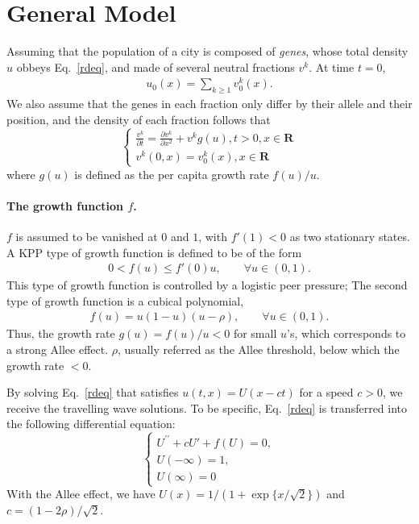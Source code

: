 \section{General Model}

Assuming that the population of a city is composed of \textit{genes}, whose total density $u$ obbeys Eq.~\ref{rdeq}, and made of several neutral fractions $v^k$. At time $t=0$, \begin{align}
    u_0(x) = \sum_{k\geq 1} v_0^k(x).
\end{align}
We also assume that the genes in each fraction only differ by their allele and their position, and the density of each fraction follows that\begin{equation}
    \left\{\begin{array}{l}
    \frac{v^{k}}{\partial{t}}=\frac{\partial v^{k}}{\partial x^2}+v^{k} g(u), t>0, x \in \mathbf{R} \\
    v^{k}(0, x)=v_{0}^{k}(x), x \in \mathbf{R}
    \end{array}\right.
\end{equation} where $g(u)$ is defined as the per capita growth rate $f(u)/u$. 

\paragraph{The growth function $f$.} 
$f$ is assumed to be vanished at $0$ and $1$, with $f'(1)<0$ as two stationary states. A KPP type of growth function is defined to be of the form~\begin{align}
    0<f(u)\le f'(0) u, \qquad \forall u \in (0,1).
\end{align} This type of growth function is controlled by a logistic peer pressure; The second type of growth function is a cubical polynomial,\begin{align}
    f(u) = u(1-u)(u-\rho), \qquad \forall u \in (0,1).
\end{align} Thus, the growth rate $g(u) = f(u)/u < 0$ for small $u$'s, which corresponds to a strong Allee effect. $\rho$, usually referred as the Allee threshold, below which the growth rate $<0$.

By solving Eq.~\ref{rdeq} that satisfies $u(t,x) = U(x-ct)$ for a speed $c>0$, we receive the travelling wave solutions. To be specific, Eq.~\ref{rdeq} is transferred into the following differential equation:\begin{equation}
    \left\{ \begin{array}{l} U^{\prime\prime} + cU' + f(U) = 0,\\
        U(-\infty) = 1,\\
        U(\infty) = 0
    \end{array} \right.
\end{equation}
With the Allee effect, we have $U(x) = 1/(1+\exp\{x/\sqrt{2}\})$ and $c = (1-2\rho)/\sqrt{2}$.

